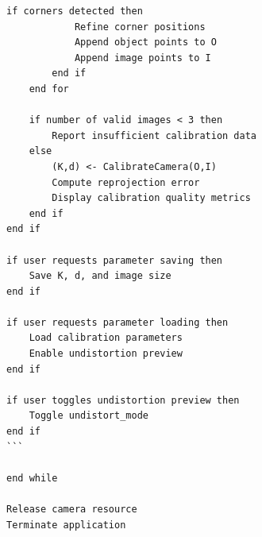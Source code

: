 \begin{lstlisting}[caption={交互式相机标定流程},
label={lst:camera_calibration}]
        if corners detected then
            Refine corner positions
            Append object points to O
            Append image points to I
        end if
    end for

    if number of valid images < 3 then
        Report insufficient calibration data
    else
        (K,d) <- CalibrateCamera(O,I)
        Compute reprojection error
        Display calibration quality metrics
    end if
end if

if user requests parameter saving then
    Save K, d, and image size
end if

if user requests parameter loading then
    Load calibration parameters
    Enable undistortion preview
end if

if user toggles undistortion preview then
    Toggle undistort_mode
end if
```

end while

Release camera resource
Terminate application

\end{lstlisting}


